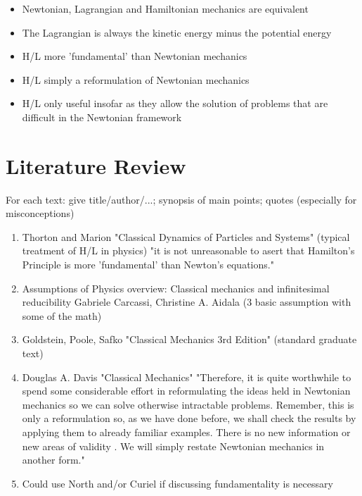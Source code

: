 \documentclass{article}
\begin{document}
\begin{itemize}
	\item Newtonian, Lagrangian and Hamiltonian mechanics are equivalent
	\item The Lagrangian is always the kinetic energy minus the potential energy 
	\item H/L more 'fundamental' than Newtonian mechanics
	\item H/L simply a reformulation of Newtonian mechanics
	\item H/L only useful insofar as they allow the solution of problems that are difficult in the Newtonian framework
\end{itemize}

\section{Literature Review}
For each text: give title/author/...; synopsis of main points; quotes (especially for misconceptions)

\begin{enumerate}
\item Thorton and Marion "Classical Dynamics of Particles and Systems"
(typical treatment of H/L in physics)
"it is not unreasonable to asert that Hamilton's Principle is more 'fundamental' than Newton's equations."
\item Assumptions of Physics overview:
Classical mechanics and infinitesimal reducibility
Gabriele Carcassi, Christine A. Aidala (3 basic assumption with some of the math)
\item Goldstein, Poole, Safko "Classical Mechanics 3rd Edition"
(standard graduate text)
\item Douglas A. Davis "Classical Mechanics"
"Therefore, it is quite worthwhile to spend some considerable effort in reformulating the ideas held in Newtonian mechanics so we can solve otherwise intractable problems. Remember, this is only a reformulation so, as we have done before, we shall check the results by applying them to already familiar examples. There is no new information or new areas of validity . We will simply restate Newtonian mechanics in another form."
\item Could use North and/or Curiel if discussing fundamentality is necessary

\end{enumerate}
\end{document}
